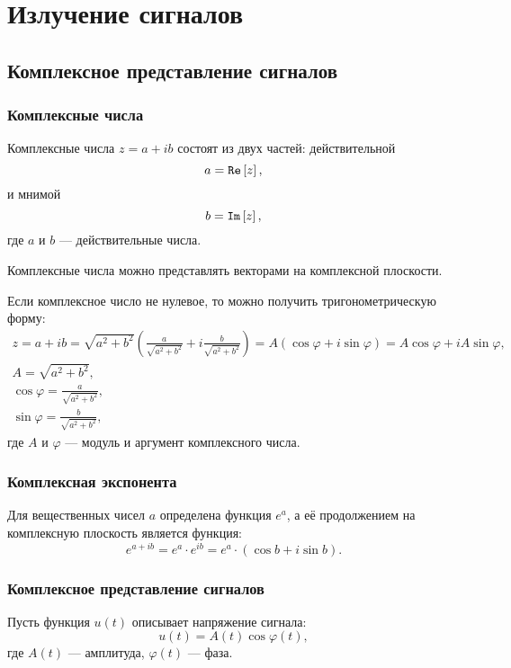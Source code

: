 \chapter{Излучение сигналов}


\section{Комплексное представление сигналов}

\subsection{Комплексные числа}

Комплексные числа $z = a + i b$ состоят из двух частей: действительной
\[
    a = \mathtt{Re} \left [ z \right ],
\]
и мнимой
\[
    b = \mathtt{Im} \left [ z \right ],
\]
где $a$ и $b$ --- действительные числа.

Комплексные числа можно представлять векторами на комплексной плоскости.

Если комплексное число не нулевое, то можно получить тригонометрическую форму:
\begin{gather*}
    z
    = a + i b
    = \sqrt{a^2 + b^2} \left ( \frac{a}{\sqrt{a^2 + b^2}} + i \frac{b}{\sqrt{a^2 + b^2}} \right )
    = A \left ( \cos \varphi + i \sin \varphi \right )
    = A \cos \varphi + i A \sin \varphi , \\
    A = \sqrt{a^2 + b^2} , \\
    \cos \varphi = \frac{a}{\sqrt{a^2 + b^2}} , \\
    \sin \varphi = \frac{b}{\sqrt{a^2 + b^2}} ,
\end{gather*}
где $A$ и $\varphi$ --- модуль и аргумент комплексного числа.

\subsection{Комплексная экспонента}

Для вещественных чисел $a$ определена функция $e^a$, а её продолжением на комплексную плоскость является функция:
\[
    e^{a + i b}
    = e^a \cdot e^{i b}
    = e^a \cdot \left ( \cos b + i \sin b \right ).
\]

\subsection{Комплексное представление сигналов}

Пусть функция $u(t)$ описывает напряжение сигнала:
\[
    u(t) = A(t) \cos \varphi(t) ,
\]
где $A(t)$ --- амплитуда, $\varphi(t)$ --- фаза.


